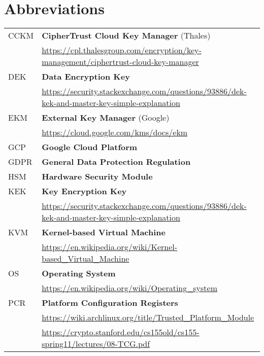 
\section*{Abbreviations}

\begin{tabular}{ ll }

CCKM
&  
\textbf{CipherTrust Cloud Key Manager }(Thales)\\
 & 
{\footnotesize\url{https://cpl.thalesgroup.com/encryption/key-management/ciphertrust-cloud-key-manager}} 
\\

DEK
&
\textbf{Data Encryption Key}\\
 & 
{\footnotesize\url{https://security.stackexchange.com/questions/93886/dek-kek-and-master-key-simple-explanation} }
\\

EKM
&
\textbf{External Key Manager} (Google)\\
 & 
{\footnotesize\url{https://cloud.google.com/kms/docs/ekm} }
\\

GCP
&
\textbf{Google Cloud Platform}
\\

GDPR
&
\textbf{General Data Protection Regulation}
\\

HSM
&
\textbf{Hardware Security Module} 
\\

KEK
&
\textbf{Key Encryption Key}\\
 & 
{\footnotesize\url{https://security.stackexchange.com/questions/93886/dek-kek-and-master-key-simple-explanation} }
\\ 

KVM
&
\textbf{Kernel-based Virtual Machine}\\
 & 
{\footnotesize\url{https://en.wikipedia.org/wiki/Kernel-based_Virtual_Machine} }
\\

OS
&
\textbf{Operating System}\\
 & 
{\footnotesize\url{https://en.wikipedia.org/wiki/Operating_system} }
\\

PCR
&
\textbf{Platform Configuration Registers }\\
 & 
{\footnotesize\url{https://wiki.archlinux.org/title/Trusted_Platform_Module}}\\
 & 
{\footnotesize\url{https://crypto.stanford.edu/cs155old/cs155-spring11/lectures/08-TCG.pdf} }
\\


\end{tabular}
